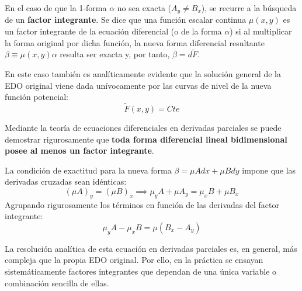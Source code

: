 \begin{definicion}
En el caso de que la 1-forma $\alpha$ no sea exacta ($A_y \neq B_x$), se recurre a la búsqueda de un \textbf{factor integrante}. Se dice que una función escalar continua $\mu(x,y)$ es un factor integrante de la ecuación diferencial (o de la forma $\alpha$) si al multiplicar la forma original por dicha función, la nueva forma diferencial resultante $\beta \equiv \mu(x,y)\alpha$ resulta ser exacta y, por tanto, $\beta = d\tilde{F}$.
\end{definicion}

En este caso también es analíticamente evidente que la solución general de la EDO original viene dada unívocamente por las curvas de nivel de la nueva función potencial:
$$ \tilde{F}(x,y) = Cte $$

\begin{proposicion}
Mediante la teoría de ecuaciones diferenciales en derivadas parciales se puede demostrar rigurosamente que \textbf{toda forma diferencial lineal bidimensional posee al menos un factor integrante}.
\end{proposicion}

La condición de exactitud para la nueva forma $\beta = \mu A dx + \mu B dy$ impone que las derivadas cruzadas sean idénticas:
$$ (\mu A)_y = (\mu B)_x \implies \mu_y A + \mu A_y = \mu_x B + \mu B_x $$
Agrupando rigurosamente los términos en función de las derivadas del factor integrante:
$$ \mu_y A - \mu_x B = \mu (B_x - A_y) $$

La resolución analítica de esta ecuación en derivadas parciales es, en general, más compleja que la propia EDO original. Por ello, en la práctica se ensayan sistemáticamente factores integrantes que dependan de una única variable o combinación sencilla de ellas.


